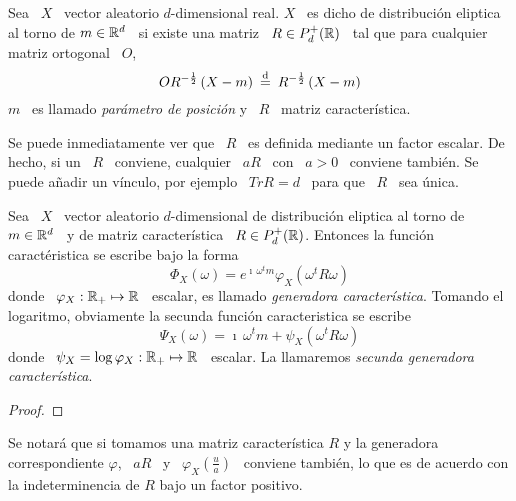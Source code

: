 

\begin{definicion}
  Sea  \  $X$  \ vector  aleatorio  $d$-dimensional  real.  $X$  \ es  dicho  de
  distribuci\'on eliptica al  torno de $m \in \mathbb{R}^d$ \ si  existe una matriz \
  $R \in P_d^+(\mathbb{R})$ \ tal que para cualquier matriz ortogonal \ $O$,
  \[
  O R^{-\frac12}  \left( X - m  \right) \: \stackrel{\mathrm{d}}{=}  \: R^{-\frac12} \left( X  - m
  \right)
  \]
  $m$  \  es  llamado  {\em  par\'ametro   de  posici\'on}  y  \  $R$  \  matriz
  caracter\'istica.
\end{definicion}
%
Se  puede  inmediatamente  ver que  \  $R$  \  es  definida mediante  un  factor
escalar. De hecho, si un  \ $R$ \ conviene, cualquier \ $a R$ \  con \ $a > 0$ \
conviene tambi\'en. Se puede  a\~nadir un v\'inculo, por ejemplo \ $Tr  R = d$ \
para que \ $R$ \ sea \'unica.

\begin{teorema}
  Sea \  $X$ \  vector aleatorio $d$-dimensional  de distribuci\'on  eliptica al
  torno  de  $m   \in  \mathbb{R}^d$  \  y  de  matriz   caracter\'istica  \  $R  \in
  P_d^+(\mathbb{R})$. Entonces la funci\'on caract\'eristica se escribe bajo la forma
  \[
  \Phi_X(\omega) = e^{\imath \, \omega^t m} \varphi_X\left( \omega^t R \omega \right)
  \]
  donde  \  $\varphi_X:  \mathbb{R}_+  \mapsto  \mathbb{R}$ \  escalar,  es  llamado  {\em
    generadora  caracter\'istica}. Tomando el  logaritmo, obviamente  la secunda
  funci\'on caracteristica se escribe
  \[
  \Psi_X(\omega) = \imath \, \omega^t m + \psi_X\left( \omega^t R \omega \right)
  \]
  donde  \  $\psi_X = \log \varphi_X:  \mathbb{R}_+  \mapsto  \mathbb{R}$ \  escalar. La llamaremos  {\em
    secunda generadora caracter\'istica}.
\end{teorema}
%
\begin{proof}
\end{proof}
%
Se  notar\'a que  si tomamos  una matriz  caracter\'istica $R$  y  la generadora
correspondiente $\varphi$, \ $a R$  \ y \ $\varphi_X\left( \frac{u}{a} \right)$ \
conviene tambi\'en, lo  que es de acuerdo con la indeterminencia  de $R$ bajo un
factor positivo.

